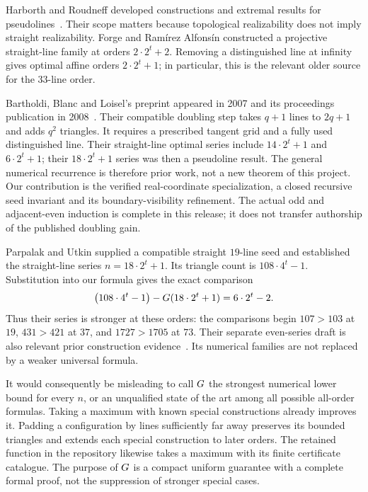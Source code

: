 Harborth and Roudneff developed constructions and extremal results for pseudolines~\citep{harborth1985,roudneff1996}. Their scope matters because topological realizability does not imply straight realizability. Forge and Ram\'irez Alfons\'in constructed a projective straight-line family at orders $2\cdot2^t+2$\citep{forge1998}. Removing a distinguished line at infinity gives optimal affine orders $2\cdot2^t+1$; in particular, this is the relevant older source for the $33$-line order.

Bartholdi, Blanc and Loisel's preprint appeared in 2007 and its proceedings publication in 2008~\citep{bbl2008}. Their compatible doubling step takes $q+1$ lines to $2q+1$ and adds $q^2$ triangles. It requires a prescribed tangent grid and a fully used distinguished line. Their straight-line optimal series include $14\cdot2^t+1$ and $6\cdot2^t+1$; their $18\cdot2^t+1$ series was then a pseudoline result. The general numerical recurrence is therefore prior work, not a new theorem of this project. Our contribution is the verified real-coordinate specialization, a closed recursive seed invariant and its boundary-visibility refinement. The actual odd and adjacent-even induction is complete in this release; it does not transfer authorship of the published doubling gain.

Parpalak and Utkin supplied a compatible straight $19$-line seed and established the straight-line series $n=18\cdot2^t+1$\citep{parpalakutkin2026}. Its triangle count is $108\cdot4^t-1$. Substitution into our formula gives the exact comparison
\begin{equation}
 \bigl(108\cdot4^t-1\bigr)-G(18\cdot2^t+1)=6\cdot2^t-2.
 \label{lit:pu-gap}
\end{equation}
Thus their series is stronger at these orders: the comparisons begin $107>103$ at $19$, $431>421$ at $37$, and $1727>1705$ at $73$. Their separate even-series draft is also relevant prior construction evidence~\citep{parpalakutkinEven2026}. Its numerical families are not replaced by a weaker universal formula.

It would consequently be misleading to call $G$ the strongest numerical lower bound for every $n$, or an unqualified state of the art among all possible all-order formulas. Taking a maximum with known special constructions already improves it. Padding a configuration by lines sufficiently far away preserves its bounded triangles and extends each special construction to later orders. The retained function in the repository likewise takes a maximum with its finite certificate catalogue. The purpose of $G$ is a compact uniform guarantee with a complete formal proof, not the suppression of stronger special cases.

